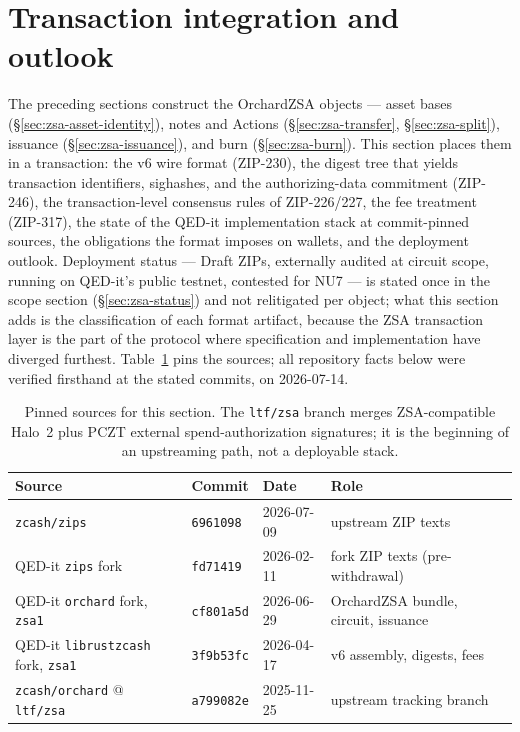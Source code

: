 \documentclass[11pt,a4paper]{article}
\theoremstyle{definition}
\begin{document}
\section{Transaction integration and outlook}\label{sec:zsa-integration}

The preceding sections construct the OrchardZSA objects --- asset bases
(\S\ref{sec:zsa-asset-identity}), notes and Actions
(\S\ref{sec:zsa-transfer}, \S\ref{sec:zsa-split}), issuance
(\S\ref{sec:zsa-issuance}), and burn (\S\ref{sec:zsa-burn}).
This section places them in a transaction: the v6 wire format (ZIP-230), the
digest tree that yields transaction identifiers, sighashes, and the
authorizing-data commitment (ZIP-246), the transaction-level consensus rules
of ZIP-226/227, the fee treatment (ZIP-317), the state of the QED-it
implementation stack at commit-pinned sources, the obligations the format
imposes on wallets, and the deployment outlook. Deployment status --- Draft
ZIPs, externally audited at circuit scope, running on QED-it's public
testnet, contested for NU7 --- is stated once in the scope section
(\S\ref{sec:zsa-status}) and not relitigated per object;
what this section adds is the classification of each format artifact, because
the ZSA transaction layer is the part of the protocol where specification and
implementation have diverged furthest. Table~\ref{tab:zsa-sources-integration}
pins the sources; all repository facts below were verified firsthand at the
stated commits, on 2026-07-14.

\begin{table}[htbp]
\centering\small
\begin{tabular}{@{}llll@{}}
\toprule
Source & Commit & Date & Role \\
\midrule
\texttt{zcash/zips} & \texttt{6961098} & 2026-07-09
  & upstream ZIP texts \\
QED-it \texttt{zips} fork & \texttt{fd71419} & 2026-02-11
  & fork ZIP texts (pre-withdrawal) \\
QED-it \texttt{orchard} fork, \texttt{zsa1} & \texttt{cf801a5d} & 2026-06-29
  & OrchardZSA bundle, circuit, issuance \\
QED-it \texttt{librustzcash} fork, \texttt{zsa1} & \texttt{3f9b53fc}
  & 2026-04-17 & v6 assembly, digests, fees \\
\texttt{zcash/orchard} @ \texttt{ltf/zsa} & \texttt{a799082e} & 2025-11-25
  & upstream tracking branch \\
\bottomrule
\end{tabular}
\caption{Pinned sources for this section. The \texttt{ltf/zsa} branch merges
ZSA-compatible Halo~2 plus PCZT external spend-authorization signatures; it
is the beginning of an upstreaming path, not a deployable stack.}
\label{tab:zsa-sources-integration}
\end{table}
\end{document}

